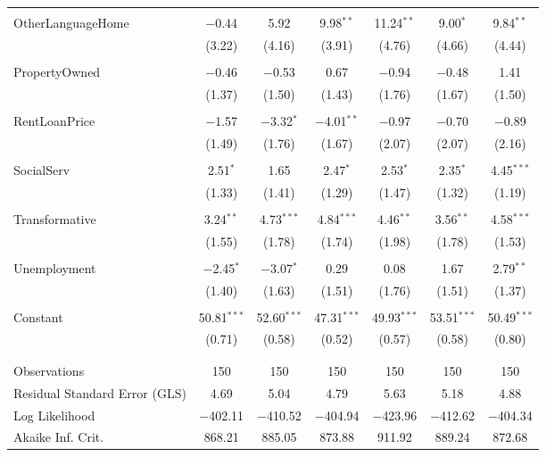 \documentclass[openany]{book}
\begin{document}
\begin{table}[!htbp]
\begin{tabular}{@{\extracolsep{1pt}}lcccccc}
  & & & & & & \\ 
 OtherLanguageHome & $-$0.44 & 5.92 & 9.98$^{**}$ & 11.24$^{**}$ & 9.00$^{*}$ & 9.84$^{**}$ \\ 
  & (3.22) & (4.16) & (3.91) & (4.76) & (4.66) & (4.44) \\ 
  & & & & & & \\ 
 PropertyOwned & $-$0.46 & $-$0.53 & 0.67 & $-$0.94 & $-$0.48 & 1.41 \\ 
  & (1.37) & (1.50) & (1.43) & (1.76) & (1.67) & (1.50) \\ 
  & & & & & & \\ 
 RentLoanPrice & $-$1.57 & $-$3.32$^{*}$ & $-$4.01$^{**}$ & $-$0.97 & $-$0.70 & $-$0.89 \\ 
  & (1.49) & (1.76) & (1.67) & (2.07) & (2.07) & (2.16) \\ 
  & & & & & & \\ 
 SocialServ & 2.51$^{*}$ & 1.65 & 2.47$^{*}$ & 2.53$^{*}$ & 2.35$^{*}$ & 4.45$^{***}$ \\ 
  & (1.33) & (1.41) & (1.29) & (1.47) & (1.32) & (1.19) \\ 
  & & & & & & \\ 
 Transformative & 3.24$^{**}$ & 4.73$^{***}$ & 4.84$^{***}$ & 4.46$^{**}$ & 3.56$^{**}$ & 4.58$^{***}$ \\ 
  & (1.55) & (1.78) & (1.74) & (1.98) & (1.78) & (1.53) \\ 
  & & & & & & \\ 
 Unemployment & $-$2.45$^{*}$ & $-$3.07$^{*}$ & 0.29 & 0.08 & 1.67 & 2.79$^{**}$ \\ 
  & (1.40) & (1.63) & (1.51) & (1.76) & (1.51) & (1.37) \\ 
  & & & & & & \\ 
 Constant & 50.81$^{***}$ & 52.60$^{***}$ & 47.31$^{***}$ & 49.93$^{***}$ & 53.51$^{***}$ & 50.49$^{***}$ \\ 
  & (0.71) & (0.58) & (0.52) & (0.57) & (0.58) & (0.80) \\ 
  & & & & & & \\ 
\hline \\[-1.8ex] 
Observations & 150 & 150 & 150 & 150 & 150 & 150 \\ 
Residual Standard Error (GLS) & 4.69 & 5.04 & 4.79 & 5.63 & 5.18 & 4.88 \\ 
Log Likelihood & $-$402.11 & $-$410.52 & $-$404.94 & $-$423.96 & $-$412.62 & $-$404.34 \\ 
Akaike Inf. Crit. & 868.21 & 885.05 & 873.88 & 911.92 & 889.24 & 872.68 \\ 

\end{tabular}
\end{table}
\end{document}
